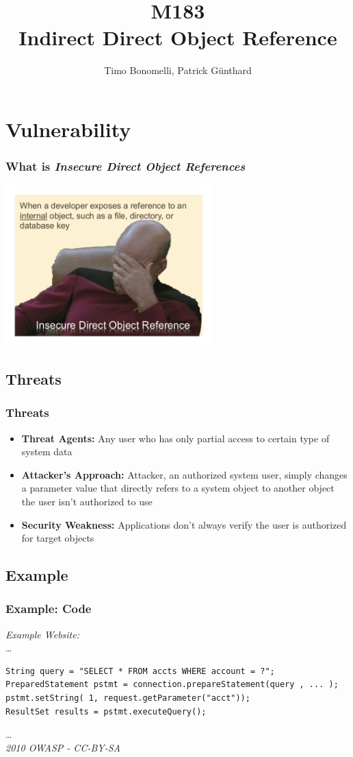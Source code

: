 \documentclass[aspectratio=169]{beamer}
\title{\textbf{M183} \\Indirect Direct Object Reference}
\author{Timo Bonomelli, Patrick Günthard}
\begin{document}
\frame{\titlepage}

\section{Vulnerability}


\begin{frame}
  \frametitle{What is \textit{Insecure Direct Object References}}
  \includegraphics[width=8cm]{meme}
\end{frame}

\subsection{Threats}
 
\begin{frame}
  \frametitle{Threats}
  \begin{itemize}
  \item \textbf{Threat Agents:} Any user who has only partial access to certain type of system data
  \item \textbf{Attacker's Approach:} Attacker, an authorized system user, simply changes a parameter value that directly refers to a system object to another object the user isn't authorized to use
  \item \textbf{Security Weakness:} Applications don’t always verify the user is authorized for target objects
  \end{itemize}
\end{frame}

\subsection{Example}

\begin{frame}[fragile]
  \label{examplecode}
  \frametitle{Example: Code}
  \textit{Example Website:}\\\tiny
\dots
\begin{verbatim}
String query = "SELECT * FROM accts WHERE account = ?";
PreparedStatement pstmt = connection.prepareStatement(query , ... );
pstmt.setString( 1, request.getParameter("acct"));
ResultSet results = pstmt.executeQuery();
\end{verbatim}
\dots\\
\tiny\textit{2010 OWASP - CC-BY-SA}
\normalsize
\end{frame}
\end{document}
